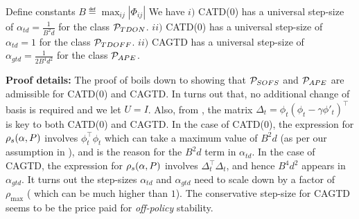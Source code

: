 \begin{comment}
\begin{definition}
\begin{itemize}
\item $\P_{ON}$: Fixed $S, A, \gamma, \Phi,\pi_b,\pi$ and letting $P$ (the probability transition kernel), reward $R$ to vary such the MDP is an irreducible Markov chains under $\pi_b$ and $\pi$. Define $\P_{SOFS} \subset \P_{APE}$ be those problems such that $\E[{\phi_t\phi_t^\top}]=\E[{\phi'_t{\phi'}_t^\top}]$
\end{itemize}
\end{definition}
\end{comment}
\begin{theorem}\label{th:tdadmis}
Define constants $B\eqdef\max_{ij}\left|\Phi_{ij}\right|$  We have 
$i)$ CATD(0) has a universal step-size of $\alpha_{td}=\frac{1}{B^2d}$ for  the class $\P_{TDON}$.
$ii)$ CATD(0) has a universal step-size of $\alpha_{td}=1$ for  the class $\P_{TDOFF}$.
$ii)$ CAGTD has a universal step-size of $\alpha_{gtd}=\frac{1}{2B^4d^2}$ for the class $\P_{APE}$.
\end{theorem}
\textbf{Proof details:} The proof of  boils down to showing that $\P_{SOFS}$ and $\P_{APE}$ are admissible for CATD(0) and CAGTD. In turns out that, no additional change of basis is required and we let $U=I$. Also, from , the matrix $\Delta_t=\phi_t(\phi_t-\gamma\phi'_t)^\top$ is key to both CATD(0) and CAGTD. In the case of CATD(0),  the expression for $\rhos{P}$ involves $\phi^\top_t\phi_t$ which can take a maximum value of $B^2d$ (as per our assumption in ), and is the reason for the $B^2d$ term in $\alpha_{td}$. In the case of CAGTD, the expression for $\rhos{P}$ involves $\Delta_t^\top \Delta_t$, and hence $B^4d^2$ appears in $\alpha_{gtd}$. It turns out the step-sizes $\alpha_{td}$ and $\alpha_{gtd}$ need to scale down by a factor of $\rho_{\max}$ ( which can be much higher than $1$). The conservative step-size for CAGTD seems to be the price paid for \emph{off-policy} stability.

